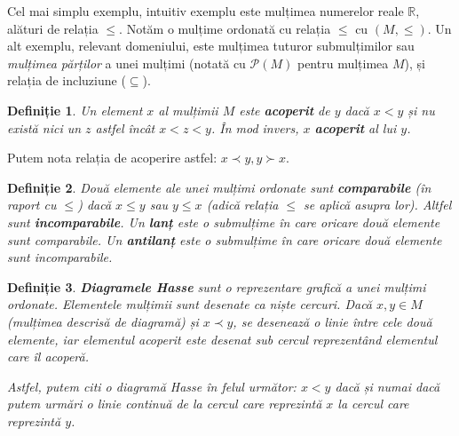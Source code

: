 \documentclass[12pt, a4paper, twoside, romanian]{teza-upb}
\newtheorem{defn}{Definiție}
\begin{document}
    Cel mai simplu exemplu, intuitiv exemplu este mulțimea numerelor reale $ \mathbb{R}$, alături de relația $\le$. Notăm o mulțime ordonată cu relația $\le$ cu $(M, \le)$. Un alt exemplu, relevant domeniului, este mulțimea tuturor submulțimilor sau \textit{mulțimea părților} a unei mulțimi (notată cu $\mathcal{P}(M)$ pentru mulțimea $M$), și relația de incluziune ($\subseteq$).

    \begin{defn}
      Un element $x$ al mulțimii $M$ este \textbf{acoperit} de $y$ dacă $x < y$ și nu există nici un $z$ astfel încât $x < z < y$. În mod invers, $x$ \textbf{acoperit} al lui $y$.
    \end{defn}

    Putem nota relația de acoperire astfel: $x \prec y, y \succ x$.

    \begin{defn}
      Două elemente ale unei mulțimi ordonate sunt \textbf{comparabile} (în raport cu $\le$) dacă $x \le y$ sau $y \le x$ (adică relația $\le$ se aplică asupra lor). Altfel sunt \textbf{incomparabile}. Un \textbf{lanț} este o submulțime în care oricare două elemente sunt comparabile. Un \textbf{antilanț} este o submulțime în care oricare două elemente sunt incomparabile.
    \end{defn}

    \begin{defn}
      \textbf{Diagramele Hasse} sunt o reprezentare grafică a unei mulțimi ordonate. Elementele mulțimii sunt desenate ca niște cercuri. Dacă $x, y \in M$ (mulțimea descrisă de diagramă) și $x \prec y$, se desenează o linie între cele două elemente, iar elementul acoperit este desenat sub cercul reprezentând elementul care îl acoperă.

      Astfel, putem citi o diagramă Hasse în felul următor: $x < y$ dacă și numai dacă putem urmări o linie continuă de la cercul care reprezintă $x$ la cercul care reprezintă $y$.
    \end{defn}
\end{document}
